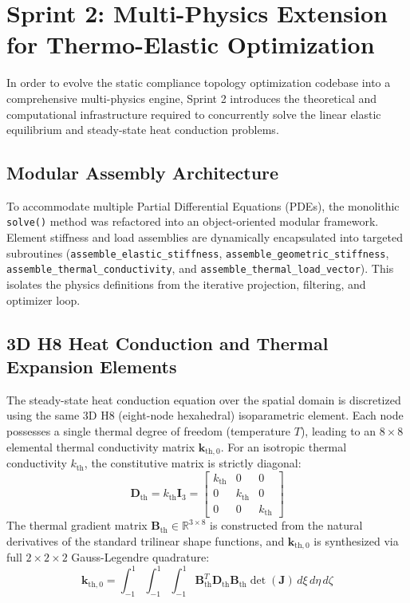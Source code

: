 \documentclass[11pt, a4paper]{article}
\begin{document}
\section{Sprint 2: Multi-Physics Extension for Thermo-Elastic Optimization}

In order to evolve the static compliance topology optimization codebase into a comprehensive multi-physics engine, Sprint 2 introduces the theoretical and computational infrastructure required to concurrently solve the linear elastic equilibrium and steady-state heat conduction problems.

\subsection{Modular Assembly Architecture}
To accommodate multiple Partial Differential Equations (PDEs), the monolithic \texttt{solve()} method was refactored into an object-oriented modular framework. Element stiffness and load assemblies are dynamically encapsulated into targeted subroutines (\texttt{assemble\_elastic\_}\allowbreak\texttt{stiffness}, \texttt{assemble\_geometric\_}\allowbreak\texttt{stiffness}, \texttt{assemble\_thermal\_}\allowbreak\texttt{conductivity}, and \texttt{assemble\_thermal\_}\allowbreak\texttt{load\_vector}). This isolates the physics definitions from the iterative projection, filtering, and optimizer loop. 

\subsection{3D H8 Heat Conduction and Thermal Expansion Elements}
The steady-state heat conduction equation over the spatial domain is discretized using the same 3D H8 (eight-node hexahedral) isoparametric element. Each node possesses a single thermal degree of freedom (temperature $T$), leading to an $8 \times 8$ elemental thermal conductivity matrix $\mathbf{k}_{\text{th}, 0}$. For an isotropic thermal conductivity $k_{\text{th}}$, the constitutive matrix is strictly diagonal:
\begin{equation}
\mathbf{D}_{\text{th}} = k_{\text{th}} \mathbf{I}_3 = \begin{bmatrix}
k_{\text{th}} & 0 & 0 \\
0 & k_{\text{th}} & 0 \\
0 & 0 & k_{\text{th}}
\end{bmatrix}
\end{equation}
The thermal gradient matrix $\mathbf{B}_{\text{th}} \in \mathbb{R}^{3 \times 8}$ is constructed from the natural derivatives of the standard trilinear shape functions, and $\mathbf{k}_{\text{th}, 0}$ is synthesized via full $2 \times 2 \times 2$ Gauss-Legendre quadrature:
\begin{equation}
\mathbf{k}_{\text{th}, 0} = \int_{-1}^1 \int_{-1}^1 \int_{-1}^1 \mathbf{B}_{\text{th}}^T \mathbf{D}_{\text{th}} \mathbf{B}_{\text{th}} \det(\mathbf{J}) \, d\xi \, d\eta \, d\zeta
\end{equation}
\end{document}
